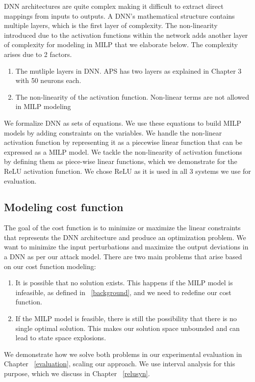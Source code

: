 DNN architectures are quite complex making it difficult to extract direct mappings from inputs to outputs. 
A \ac{DNN}'s  mathematical structure contains multiple layers, which is the first layer of complexity. The non-linearity introduced due to the activation functions within the network adds another layer of complexity for modeling in \ac{MILP}  that we elaborate below. 
The complexity arises due to 2 factors.
\begin{enumerate}
	\item The mutliple layers in \ac{DNN}.
	\ac{APS} has two layers as explained in Chapter 3
	  with 50 neurons each. 
	\item The non-linearity  of the activation function. 
	Non-linear terms are not allowed in \ac{MILP} modeling \cite{gnonlinearity}
\end{enumerate}

We formalize \ac{DNN} as sets of equations.
We use these equations to build \ac{MILP} models by adding constraints on the variables. 
We handle the non-linear activation function by representing it as a piecewise linear function that can be expressed as a \ac{MILP} model. 
We tackle the non-linearity of activation functions by defining them as piece-wise linear functions, which we demonstrate for the ReLU activation function.
We chose ReLU as it is used in all 3 systems we use for evaluation. 

\subsection{Modeling cost function}
The goal of the cost function is to minimize or maximize the linear constraints that represents the \ac{DNN} architecture and produce an optimization problem. 
We want to minimize the input perturbations and maximize the output deviations in a \ac{DNN} as per our attack model. 
There are two main problems that arise based on our cost function modeling:
\begin{enumerate}
	\item It is possible that no solution exists. 
	This happens if the \ac{MILP} model is infeasible, as defined in ~\ref{background}, and we need to redefine our cost function. 
	\item If the \ac{MILP} model is feasible, there is still the possibility that there is no single optimal solution. 
	This makes our solution space unbounded and can lead to state space explosions. 
\end{enumerate}

We demonstrate how we solve both problems in our experimental evaluation in Chapter ~\ref{evaluation}, scaling our approach. 
We use interval analysis for this purpose, which we discuss in Chapter ~\ref{relusyn}. 


















